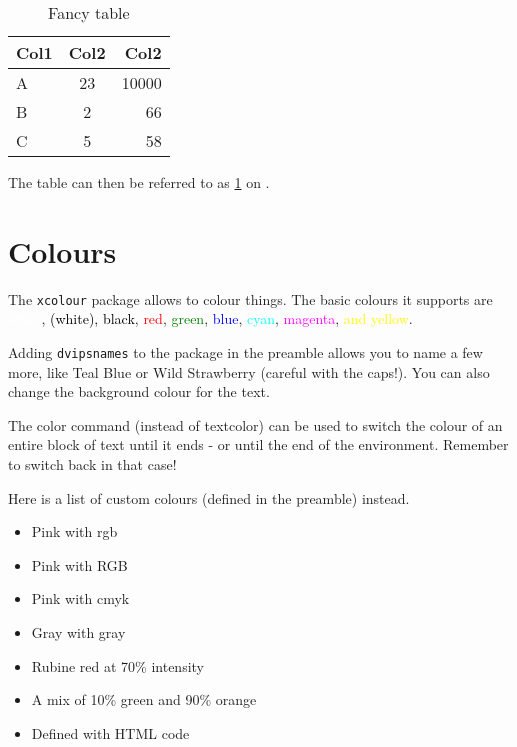 \documentclass[12pt, letterpaper]{article} %
\begin{document}
\begin{table}[h] %
	\centering %
	\begin{tabular}{|| l | c | r ||} %
		\hline %
		Col1 &	Col2 &	Col2	\\ \hline\hline %
		A	 &	23	 &	10000	\\ \hline
		B	 &	2	 &	66		\\ \hline
		C	 &	5	 &	58 		\\ [1ex] \hline %
	\end{tabular}
	\caption{Fancy table} %
	\label{table:data} %
\end{table}

The table can then be referred to as \cref{table:data} on .

\section{Colours}

The \texttt{xcolour} package allows to colour things. 
The basic colours it supports are 
\textcolor{white}{white}, 
\textcolor{black}{(white), black}, 
\textcolor{red}{red}, 
\textcolor{green}{green}, 
\textcolor{blue}{blue}, 
\textcolor{cyan}{cyan}, 
\textcolor{magenta}{magenta}, 
\textcolor{yellow}{and yellow}.

Adding \texttt{dvipsnames} to the package in the preamble 
allows you to name a few more, like 
\textcolor{TealBlue}{Teal Blue} or 
\textcolor{WildStrawberry}{Wild Strawberry} 
(careful with the caps!). 
You can also change \colorbox{BurntOrange}{the background colour} 
for the text.

The color command (instead of textcolor) can be used 
\color{cyan}to switch the colour of an entire block of text 
until it ends - or until the end of the environment. 
Remember to \color{black} switch back in that case!

Here is a list of custom colours (defined in the preamble) instead.
\begin{itemize}
	\item \textcolor{mypink1}{Pink with rgb}
	\item \textcolor{mypink2}{Pink with RGB}
	\item \textcolor{mypink3}{Pink with cmyk}
	\item \textcolor{mygray}{Gray with gray}
	\item \textcolor{LightRubineRed}{Rubine red at 70\% intensity}
	\item \textcolor{OrangeGreen}{A mix of 10\% green and 90\% orange}
	\item \textcolor{HTMLColor}{Defined with HTML code}
\end{itemize}
\end{document}
